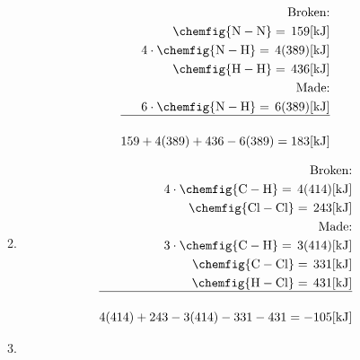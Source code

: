 \documentclass[12pt]{article}
\begin{document}
\begin{enumerate}
\begin{enumerate}
        \begin{equation}
          \begin{split}
            \text{Broken:}\\
            \chemfig{\ce{N}-\ce{N}}=\,159[\si{\kilo\joule}]\\
            4\cdot\chemfig{\ce{N}-\ce{H}}=\,4(389)[\si{\kilo\joule}]\\
            \chemfig{\ce{H}-\ce{H}}=\,436[\si{\kilo\joule}]\\
            \text{Made:}\\
            6\cdot\chemfig{\ce{N}-\ce{H}}=\,6(389)[\si{\kilo\joule}]\\
            \hline\\
            159+4(389)+436-6(389)=183[\si{\kilo\joule}]
          \end{split}
          \label{4}
        \end{equation}

      \item {}

        \begin{equation}
          \begin{split}
            \text{Broken:}\\
            4\cdot\chemfig{\ce{C}-\ce{H}}=\,4(414)[\si{\kilo\joule}]\\
            \chemfig{\ce{Cl}-\ce{Cl}}=\,243[\si{\kilo\joule}]\\
            \text{Made:}\\
            3\cdot\chemfig{\ce{C}-\ce{H}}=\,3(414)[\si{\kilo\joule}]\\
            \chemfig{\ce{C}-\ce{Cl}}=\,331[\si{\kilo\joule}]\\
            \chemfig{\ce{H}-\ce{Cl}}=\,431[\si{\kilo\joule}]\\
            \hline\\
            4(414)+243-3(414)-331-431=-105[\si{\kilo\joule}]\\
          \end{split}
          \label{5}
        \end{equation}

      \item {}


\end{enumerate}
\end{enumerate}
\end{document}
